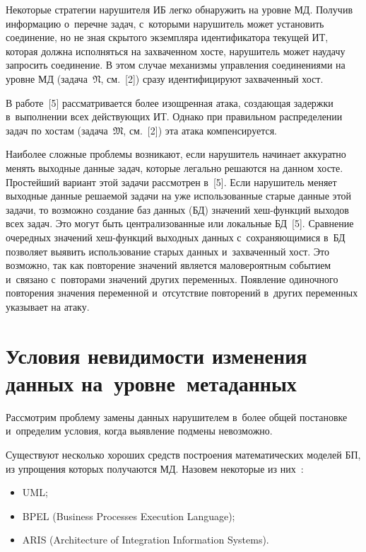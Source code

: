 \begin{multicols}{2}
  Некоторые стратегии нарушителя ИБ легко обнаружить на уровне МД. Получив 
информацию о~перечне задач, с~которыми нарушитель может установить 
соединение, но не зная скрытого экземпляра идентификатора текущей ИТ, которая 
должна исполняться на захваченном хосте, нарушитель может наудачу запросить 
соединение. В этом случае механизмы управления соединениями на уровне МД 
(задача~$\mathfrak{N}$, см.~[2]) сразу идентифицируют захваченный хост.
  
  В работе~[5] рассматривается более изощренная атака, создающая задержки 
в~выполнении всех действующих ИТ. Однако при правильном распределении 
задач по хостам (задача~$\mathfrak{M}$, см.~[2]) эта атака компенсируется.
  
  Наиболее сложные проблемы возникают, если нарушитель начинает аккуратно 
менять выходные данные задач, которые легально решаются на данном хосте. 
Простейший вариант этой задачи рассмотрен в~[5]. Если нарушитель меняет 
выходные данные решаемой задачи на уже использованные старые данные этой 
задачи, то возможно создание баз данных (БД) значений хеш-функ\-ций выходов всех 
задач. Это могут быть централизованные или локальные БД~[5]. 
Сравнение очередных значений хеш-функ\-ций выходных данных 
с~сохраняющимися в~БД позволяет выявить использование старых данных 
и~захваченный хост. Это возможно, так как повторение значений 
является маловероятным событием и~связано с~повторами значений других 
переменных. Появление одиночного повторения значения переменной 
и~отсутствие повторений в~других переменных указывает на атаку.

\section{Условия невидимости изменения данных на~уровне~метаданных}

  Рассмотрим проблему замены данных нарушителем в~более общей постановке 
и~определим условия, когда выявление подмены невозможно. 
  
  Существуют несколько хороших средств построения математических моделей 
БП, из упрощения которых получаются МД. Назовем 
некоторые из них~\cite{4-gr}:
  \begin{itemize}
\item UML;
\item BPEL (Business Processes Execution Language);
\item ARIS (Architecture of Integration Information Systems).
\end{itemize}


\end{multicols}
